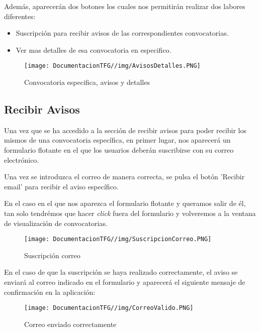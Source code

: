 Además, aparecerán dos botones los cuales nos permitirán realizar dos labores diferentes:

\begin{itemize}
    \item Suscripción para recibir avisos de las correspondientes convocatorias.
    \item Ver mas detalles de esa convocatoria en especifico.
\end{itemize}

\begin{figure}[H]
    \centering
    \texttt{[image: DocumentacionTFG//img/AvisosDetalles.PNG]}
    \caption{Convocatoria especifica, avisos y detalles}
    \label{fig:avisos-detalles}
\end{figure}

\subsection{Recibir Avisos}
Una vez que se ha accedido a la sección de recibir avisos para poder recibir los mismos de una convocatoria específica, en primer lugar, nos aparecerá un formulario flotante en el que los usuarios deberán suscribirse con su correo electrónico.

Una vez se introduzca el correo de manera correcta, se pulsa el botón 'Recibir email' para recibir el aviso específico.

En el caso en el que nos aparezca el formulario flotante y queramos salir de él, tan solo tendrémos que hacer \textit{click} fuera del formulario y volveremos a la ventana de visualización de convocatorias.

\begin{figure}[H]
    \centering
    \texttt{[image: DocumentacionTFG//img/SuscripcionCorreo.PNG]}
    \caption{Suscripción correo}
    \label{fig:suscripcion-correo}
\end{figure}

En el caso de que la suscripción se haya realizado correctamente, el aviso se enviará al correo indicado en el formulario y aparecerá el siguiente mensaje de confirmación en la aplicación:

\begin{figure}[H]
    \centering
    \texttt{[image: DocumentacionTFG//img/CorreoValido.PNG]}
    \caption{Correo enviado correctamente}
    \label{fig:correo-enviado}
\end{figure}

